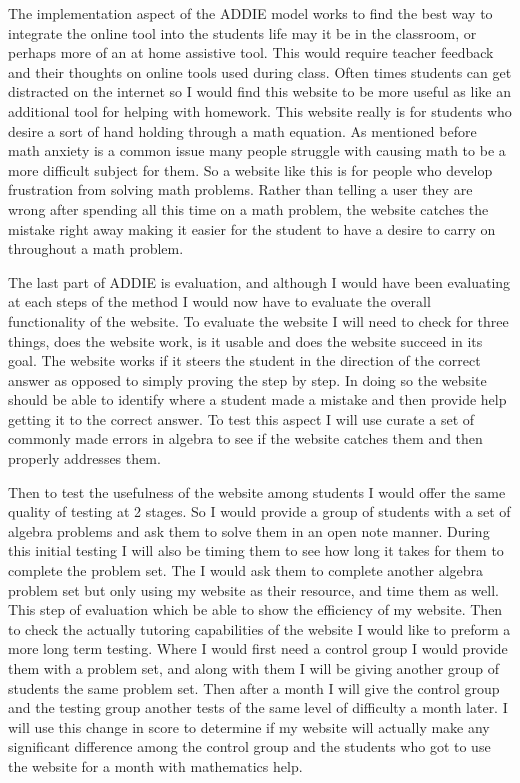 \documentclass[10pt,twocolumn]{article}
\begin{document}
The implementation aspect of the ADDIE model works to find the best way to integrate the online tool into the students life may it be in the classroom, or perhaps more of an at home assistive tool. This would require teacher feedback and their thoughts on online tools used during class. Often times students can get distracted on the internet so I would find this website to be more useful as like an additional tool for helping with homework. This website really is for students who desire a sort of hand holding through a math equation. As mentioned before math anxiety is a common issue many people struggle with causing math to be a more difficult subject for them. So a website like this is for people who develop frustration from solving math problems. Rather than telling a user they are wrong after spending all this time on a math problem, the website catches the mistake right away making it easier for the student to have a desire to carry on throughout a math problem. 

The last part of ADDIE is evaluation, and although I would have been evaluating at each steps of the method I would now have to evaluate the overall functionality of the website. To evaluate the website I will need to check for three things, does the website work, is it usable and does the website succeed in its goal. The website works if it steers the student in the direction of the correct answer as opposed to simply proving the step by step. In doing so the website should be able to identify where a student made a mistake and then provide help getting it to the correct answer. To test this aspect I will use curate a set of commonly made errors in algebra to see if the website catches them and then properly addresses them. 

Then to test the usefulness of the website among students I would offer the same quality of testing at 2 stages. So I would provide a group of students with a set of algebra problems and ask them to solve them in an open note manner. During this initial testing I will also be timing them to see how long it takes for them to complete the problem set. The I would ask them to complete another algebra problem set but only using my website as their resource, and time them as well. This step of evaluation which be able to show the efficiency of my website. Then to check the actually tutoring capabilities of the website I would like to preform a more long term testing. Where I would first need a control group I would provide them with a problem set, and along with them I will be giving another group of students the same problem set. Then after a month I will give the control group and the testing group another tests of the same level of difficulty a month later. I will use this change in score to determine if my website will actually make any significant difference among the control group and the students who got to use the website for a month with mathematics help. %
\end{document}

